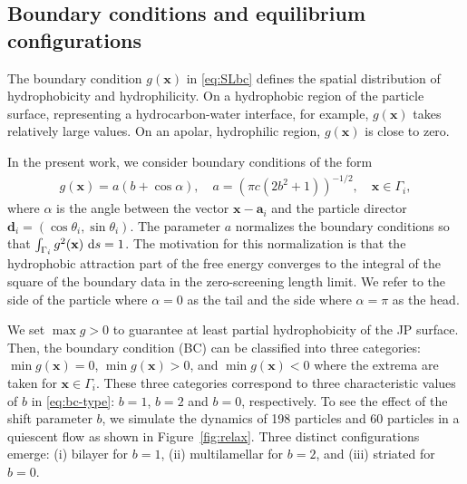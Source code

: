 \documentclass[prb,preprint,showpacs,preprintnumbers,amsmath,amssymb,longbibliography]{revtex4-1}
\renewcommand{\aa}{\mathbf{a}}
\newcommand{\dd}{\mathbf{d}}
\newcommand{\xx}{\mathbf{x}}
\begin{document}
\subsection{Boundary conditions and equilibrium configurations}
The boundary condition $g(\xx)$ in
\eqref{eq:SLbc} defines the spatial distribution of
hydrophobicity and hydrophilicity.  On a hydrophobic region of the
particle surface, representing a hydrocarbon-water interface,
for example, $g(\xx)$ takes relatively large values.
On an apolar, hydrophilic region, $g(\xx)$ is close to zero.

In the present work, we consider boundary conditions of the form
\begin{align}
  \label{eq:bc-type}
g(\xx) = a(b + \cos \alpha),\quad a = (\pi c(2b^2 + 1))^{-1/2},\quad \xx \in \Gamma_i,
\end{align}
where $\alpha$ is the angle between the vector $\xx - \aa_i$ and 
the particle director $\dd_i = (\cos \theta_i, \sin \theta_i)$.
The parameter $a$ normalizes the boundary conditions 
so that $\int_{\Gamma_i} g^2(\xx) \, \dif s =  1$.
The motivation for this normalization is that the hydrophobic attraction
part of the free energy converges to the integral of the square of the boundary
data in the zero-screening length limit.  
We refer to the side of the particle where $\alpha = 0$
as the tail and the side where $\alpha = \pi$ as the head. 


We set $\max g>0$ to guarantee at least partial hydrophobicity of the JP
surface.  Then, the boundary condition (BC) can be classified into three
categories: $\min g(\xx) = 0$, $\min g(\xx) >0$, and $\min g(\xx) <0$
where the extrema are taken for $\xx \in \Gamma_i$.  These three
categories correspond to three characteristic values of $b$ in
\eqref{eq:bc-type}: $b=1$, $b=2$ and $b=0$, respectively. 
%
To see the effect of the shift parameter $b$, we simulate the dynamics
of 198 particles and 60 particles in a quiescent flow as shown in
Figure~\ref{fig:relax}. Three distinct configurations emerge: (i)
bilayer for $b = 1$, (ii) multilamellar for $b = 2$, and (iii) striated
for $b = 0$.
\end{document}
